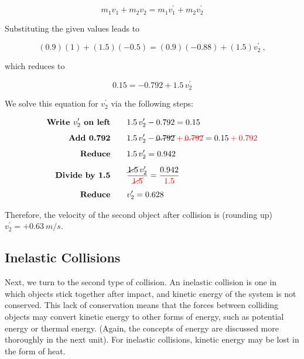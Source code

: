 \documentclass[main.tex]{subfiles}
\begin{document}
\begin{equation*} 
    m_1 v_1 + m_2 v_2 = m_1 v_1^{\prime} + m_2 v_2^{\prime}
\end{equation*}

Substituting the given values leads to

\begin{equation*}
    (0.9)(1) + (1.5)(-0.5) = (0.9)(-0.88) + (1.5) v_2^{\prime}\ ,
\end{equation*}

which reduces to

\begin{equation*}
    0.15 = -0.792 + 1.5\,v_2^{\prime}
\end{equation*}

We solve this equation for $v_2^{\prime}$ via the following steps:
\vspace{-1em}

\begin{align*}
    \textbf{Write $v_2^{\prime}$ on left} \qquad & 1.5\,v_2^{\prime} - 0.792 = 0.15\\[1ex]
    \textbf{Add 0.792} \qquad & 1.5\,v_2^{\prime} - \cancel{0.792} \mathbin{\color{red} +} \textcolor{red}{\cancel{0.792}} = 0.15 \mathbin{\color{red} +} \textcolor{red}{0.792}\\[1ex]
    \textbf{Reduce} \qquad & 1.5\,v_2^{\prime} = 0.942\\[1ex]
    \textbf{Divide by 1.5} \qquad & \frac{\cancel{1.5}\,v_2^{\prime}}{\textcolor{red}{\cancel{1.5}}} = \frac{0.942}{\textcolor{red}{1.5}}\\[1ex]
    \textbf{Reduce} \qquad & v_2^{\prime} = 0.628
\end{align*}

Therefore, the velocity of the second object after collision is (rounding up) $v_2^{\prime} = +\SI{0.63}{m/s}$.

\solutionEnd

\cyanhrule

\subsection{Inelastic Collisions} \label{v90mza}

Next, we turn to the second type of collision. An \gls{inelastic collision} is one in which objects stick together after impact, and kinetic energy of the system is not conserved. This lack of conservation means that the forces between colliding objects may convert kinetic energy to other forms of energy, such as potential energy or thermal energy. (Again, the concepts of energy are discussed more thoroughly in the next unit). For inelastic collisions, kinetic energy may be lost in the form of heat. 
\vspace{1em}
\end{document}
